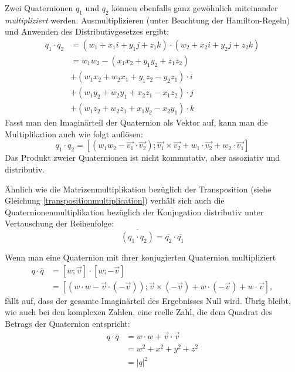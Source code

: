 Zwei Quaternionen $q_1$ und $q_2$ können ebenfalls ganz gewöhnlich miteinander \emph{multipliziert} werden. Ausmultiplizieren (unter Beachtung der Hamilton-Regeln) und Anwenden des Distributivgesetzes ergibt:
\begin{equation}
\begin{split}
 q_1 \cdot q_2 &= ( w_1 + x_{1}i + y_{1}j + z_{1}k ) \cdot ( w_2 + x_{2}i + y_{2}j + z_{2}k ) \\
 &= w_1 w_2 - ( x_1 x_2 + y_1 y_2 + z_1 z_2 ) \\
    & + ( w_1 x_2 + w_2 x_1 + y_1 z_2 - y_2 z_1 ) \cdot i \\
    & + ( w_1 y_2 + w_2 y_1 + x_2 z_1 - x_1 z_2 ) \cdot j \\
    & + ( w_1 z_2 + w_2 z_1 + x_1 y_2 - x_2 y_1 ) \cdot k
\end{split}
\end{equation}
Fasst man den Imaginärteil der Quaternion als Vektor auf, kann man die Multiplikation auch wie folgt auflösen:
\begin{equation}
 \label{quaternionmultiplicationvector}
 q_1 \cdot q_2 = \left[ \left( w_1 w_2 - \vec{v_1} \cdot \vec{v_2} \right); \vec{v_1} \times \vec{v_2} + w_1 \cdot \vec{v_2} + w_2 \cdot \vec{v_1} \right]
\end{equation}
Das Produkt zweier Quaternionen ist nicht kommutativ, aber assoziativ und distributiv.

Ähnlich wie die Matrizenmultiplikation bezüglich der Transposition (siehe Gleichung \ref{transpositionmultiplication}) verhält sich auch die Quaternionenmultiplikation bezüglich der Konjugation distributiv unter Vertauschung der Reihenfolge:
\begin{equation}
 \label{quaternionconjugationmultiplication}
 \overline{( q_1 \cdot q_2 )} = \overline{q_2} \cdot \overline{q_1}
\end{equation} 

Wenn man eine Quaternion mit ihrer konjugierten Quaternion multipliziert
\begin{equation}
\begin{split}
 q \cdot \overline{q} &= \left[ w; \vec v \right] \cdot \left[ w; -\vec v \right] \\
 & = \left[ \left( w \cdot w - \vec{v} \cdot (-\vec{v}) \right); \vec{v} \times (-\vec{v}) + w \cdot \left(-\vec{v}\right) + w \cdot \vec{v} \right],
\end{split}
\end{equation}
fällt auf, dass der gesamte Imaginärteil des Ergebnisses Null wird. Übrig bleibt, wie auch bei den komplexen Zahlen, eine reelle Zahl, die dem Quadrat des Betrags der Quaternion entspricht:
\begin{equation}
\begin{split}
 q \cdot \overline{q} &= w \cdot w + \vec v \cdot \vec v \\
 &= w^2 + x^2 + y^2 + z^2 \\
 &= \left| q \right|^2
\end{split}
\end{equation}

